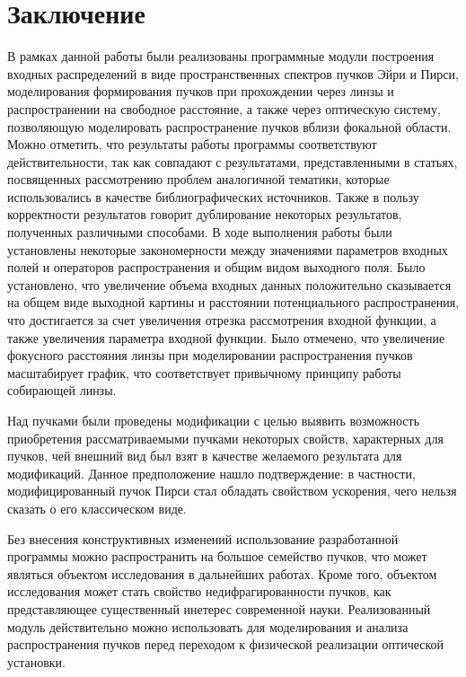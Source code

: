     \section*{Заключение}
    {
    В рамках данной работы были реализованы
    программные модули построения входных распределений в виде пространственных спектров пучков Эйри и Пирси, моделирования
    формирования пучков при прохождении через линзы и распространении на свободное расстояние, а также через оптическую систему,
    позволяющую моделировать распространение пучков вблизи фокальной области. Можно отметить, что
    результаты работы программы соответствуют действительности, так как
    совпадают с результатами, представленными в статьях, посвященных
    рассмотрению проблем аналогичной тематики, которые использовались в
    качестве библиографических источников. Также в пользу корректности результатов говорит дублирование некоторых результатов,
    полученных различными способами. В ходе выполнения работы были
    установлены некоторые закономерности между значениями параметров
    входных полей и операторов распространения и общим видом выходного поля. Было установлено, что
    увеличение объема входных данных положительно сказывается на общем виде
    выходной картины и расстоянии потенциального распространения, что достигается за счет увеличения отрезка рассмотрения
    входной функции, а также увеличения параметра входной функции. Было
    отмечено, что увеличение фокусного расстояния линзы при моделировании
    распространения пучков масштабирует график, что соответствует привычному принципу работы собирающей линзы.

    Над пучками были проведены модификации с целью выявить возможность приобретения рассматриваемыми
    пучками некоторых свойств, характерных для пучков, чей внешний вид был взят в качестве желаемого
    результата для модификаций. Данное предположение нашло подтверждение:
    в частности, модифицированный пучок Пирси стал обладать свойством ускорения,
    чего нельзя сказать о его классическом виде.

    Без внесения конструктивных изменений использование разработанной
    программы можно распространить на большое семейство пучков, что может
    являться объектом исследования в дальнейших работах. Кроме того, объектом исследования
    может стать свойство недифрагированности пучков, как представляющее существенный инетерес
    современной науки. Реализованный модуль
    действительно можно использовать для моделирования и анализа
    распространения пучков перед переходом к физической реализации оптической
    установки.

    \newpage
    }



